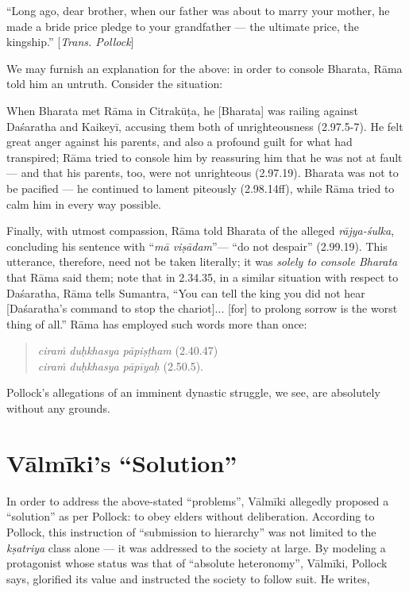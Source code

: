 \begin{myquote}
“Long ago, dear brother, when our father was about to marry your mother, he made a bride price pledge to your grandfather --- the ultimate price, the kingship.” [{\sl Trans. Pollock}]
\end{myquote}

We may furnish an explanation for the above: in order to console Bharata, Rāma told him an untruth. Consider the situation:

When Bharata met Rāma in Citrakūṭa, he [Bharata] was railing against Daśaratha and Kaikeyī, accusing them both of unrighteousness (2.97.5-7). He felt great anger against his parents, and also a profound guilt for what had transpired; Rāma tried to console him by reassuring him that he was not at fault --- and that his parents, too, were not unrighteous (2.97.19). Bharata was not to be pacified --- he continued to lament piteously (2.98.14ff), while Rāma tried to calm him in every way possible. 

Finally, with utmost compassion, Rāma told Bharata of the alleged {\sl rājya-śulka}, concluding his sentence with “{\sl mā viṣādam}”--- “do not despair” (2.99.19). This utterance, therefore, need not be taken literally; it was {\sl solely to console Bharata} that Rāma said them; note that in 2.34.35, in a similar situation with respect to Daśaratha, Rāma tells Sumantra, “You can tell the king you did not hear [Daśaratha’s command to stop the chariot]... [for] to prolong sorrow is the worst thing of all.” Rāma has employed such words more than once: 
\begin{quote}
{\sl ciraṁ duḥkhasya pāpiṣṭham} (2.40.47)\\ 
{\sl ciraṁ duḥkhasya pāpīyaḥ} (2.50.5). 
\end{quote}

Pollock’s allegations of an imminent dynastic struggle, we see, are absolutely without any grounds. 

\section{Vālmīki’s “Solution”}\label{sec1.3}

In order to address the above-stated “problems”, Vālmīki allegedly proposed a “solution” as per Pollock: to obey elders without deliberation. According to Pollock, this instruction of “submission to hierarchy” was not limited to the {\sl kṣatriya} class alone --- it was addressed to the society at large. By modeling a protagonist whose status was that of “absolute heteronomy”, Vālmīki, Pollock says, glorified its value and instructed the society to follow suit. He writes, 

